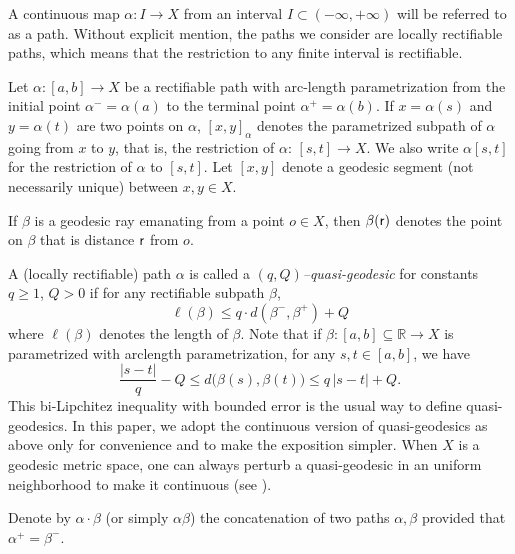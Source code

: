 \documentclass{amsart}
\theoremstyle{definition}
\theoremstyle{remark}
\newcommand{\U}{ X}
\newcommand{\go}{{o}}
\newcommand{\rr}{{\sf r}}
\newcommand{\len }{\ell}
\begin{document}


A continuous map $\alpha:I\to X$ from an interval $I\subset (-\infty, +\infty)$ will be referred to as a path. Without explicit mention, the paths we consider are locally rectifiable paths, which means that the restriction  to any finite interval is rectifiable.  

Let $\alpha: [a,b]\to \U$ be a rectifiable  path  with arc-length parametrization from the initial point $\alpha^-=\alpha(a)$ to the terminal point $\alpha^+=\alpha(b)$. If $x=\alpha(s)$ and $y=\alpha(t)$ are two points on $\alpha$, $[x,y]_\alpha$ denotes the parametrized
subpath of $\alpha$ going from $x$ to $y$, that is, the restriction of $\alpha$: $[s,t]\to \U$. 
We also write $\alpha[s,t]$ for the restriction of $\alpha$ to $[s,t]$. 
Let $[x, y]$ denote a geodesic segment (not necessarily unique) between $x, y\in \U$. 

If $\beta$ is a geodesic ray emanating from a point $\go\in X$, then $ \beta({\rr})$ denotes the point on $ \beta $  that is distance $ \rr $ from $\go$.
 
A (locally rectifiable) path $\alpha$ is called a \textit{$(q, Q)$--quasi-geodesic} for constants $q\geq 1$, $Q>0$  if for   any rectifiable subpath $\beta$,
$$\len(\beta)\le q\cdot d(\beta^-, \beta^+)+Q$$
 where   $\ell(\beta)$ denotes the length of $\beta$. Note that if $\beta: [a,b]\subseteq \mathbb R\to \U$ is  parametrized   with arclength parametrization,  for any $s, t \in [a, b]$, we have 
\[
\frac{|s-t|}{q} - Q  \leq d \big(\beta (s), \beta(t)\big) 
   \leq q\, |s-t|+ Q.	
\]
This bi-Lipchitez inequality with bounded error is the usual way to define quasi-geodesics.  
In this paper, we adopt the continuous version of quasi-geodesics as above only for convenience and to make the exposition simpler. 
When $X$ is a geodesic metric space, one can always perturb a quasi-geodesic in an uniform neighborhood to make it continuous 
(see  \cite[Lemma III.1.11]{BriHae}).
 
Denote by $\alpha\cdot \beta$ (or simply $\alpha\beta$) the concatenation of two paths $\alpha, \beta$  provided that $\alpha^+ =
\beta^-$.
 
 
\end{document}
